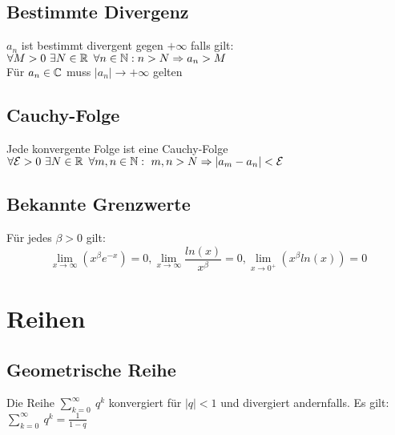 \documentclass[german]{latex4ei/latex4ei_sheet}
\begin{document}
\begin{sectionbox}
	\subsection{Bestimmte Divergenz}

	\(a_n\) ist bestimmt divergent gegen $+\infty$ falls gilt: \\
	$\forall M >0 \text{ }\exists N \in \operatorname{\mathbb R} \text{ }\forall n \in \operatorname{\mathbb N}: n>N \Rightarrow a_n>M$ \\
Für $a_n \in \mathbb C $ muss $|a_n| \rightarrow +\infty $ gelten
\end{sectionbox}


\begin{sectionbox}
	\subsection{Cauchy-Folge}
	Jede konvergente Folge ist eine Cauchy-Folge \\
	$	\forall\mathcal{E}>0 \text{ }\exists N \in \operatorname{\mathbb R} \text{ }\forall m,n \in \operatorname{\mathbb N}:\text{ } m,n>N \Rightarrow |a_m - a_n|<\mathcal{E}$

\end{sectionbox}

\begin{sectionbox}
	\subsection{Bekannte Grenzwerte}
	Für jedes $\beta > 0$ gilt:
	\begin{equation*}
		\lim \limits_{x \to \infty}(x^\beta e^{-x})= 0, \lim \limits_{x \to \infty} \frac{ln(x)}{x^\beta} = 0, \lim \limits_{x \to 0^+}(x^\beta ln(x))= 0
	\end{equation*}

\end{sectionbox}





\section{Reihen}

\begin{sectionbox}
	\subsection{Geometrische Reihe}
	Die Reihe $\sum \limits_{k=0}^{\infty}\ q^k$ konvergiert für $|q|<1$ und divergiert andernfalls. Es gilt:\\
	$\sum \limits_{k=0}^{\infty}\ q^k = \frac{1}{1-q}$

\end{sectionbox}
\end{document}
